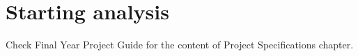 
\chapter{Starting analysis}
Check Final Year Project Guide for the content of Project Specifications chapter.

\clearpage %
